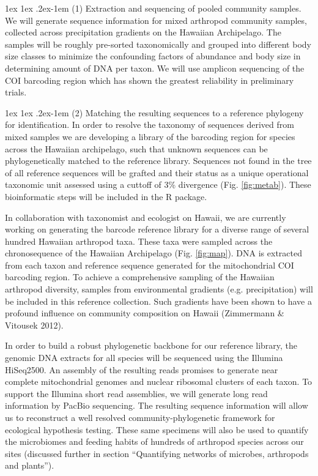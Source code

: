 \documentclass[11pt]{article}
\makeatletter
\renewcommand{\paragraph}{\@startsection{paragraph}{4}{\z@}
  {1ex \@plus 1ex \@minus .2ex}{-1em}
  {\normalfont\normalsize\it}
}
\makeatother
\begin{document}
\paragraph{(1) Extraction and sequencing of pooled community samples.}
We will generate sequence information for mixed arthropod community
samples, collected across precipitation gradients on the Hawaiian
Archipelago. The samples will be roughly pre-sorted taxonomically and
grouped into different body size classes to minimize the confounding
factors of abundance and body size in determining amount of DNA per
taxon. We will use amplicon sequencing of the COI barcoding region
\citep{} which has shown the greatest reliability in preliminary
trials.


\paragraph{(2) Matching the resulting sequences to a reference
  phylogeny for identification.}
In order to resolve the taxonomy of sequences derived from mixed
samples we are developing a library of the barcoding region for
species across the Hawaiian archipelago, such that unknown sequences
can be phylogenetically matched \citep{} to the reference library.
Sequences not found in the tree of all reference sequences will be
grafted and their status as a unique operational taxonomic unit
assessed using a cuttoff of 3\% divergence (Fig. \ref{fig:metab}).
These bioinformatic steps will be included in the R package.

In collaboration with taxonomist and ecologist on Hawaii, we are
currently working on generating the barcode reference library for a
diverse range of several hundred Hawaiian arthropod taxa. These taxa
were sampled across the chronosequence of the Hawaiian Archipelago
(Fig. \ref{fig:map}). DNA is extracted from each taxon and reference
sequence generated for the mitochondrial COI barcoding region. To
achieve a comprehensive sampling of the Hawaiian arthropod diversity,
samples from environmental gradients (e.g. precipitation) will be
included in this reference collection. Such gradients have been shown
to have a profound influence on community composition on Hawaii
(Zimmermann \& Vitousek 2012).

In order to build a robust phylogenetic backbone for our reference
library, the genomic DNA extracts for all species will be sequenced
using the Illumina HiSeq2500. An assembly of the resulting reads
promises to generate near complete mitochondrial genomes and nuclear
ribosomal clusters of each taxon. To support the Illumina short read
assemblies, we will generate long read information by PacBio
sequencing. The resulting sequence information will allow us to
reconstruct a well resolved community-phylogenetic framework for
ecological hypothesis testing.  These same specimens will also be used
to quantify the microbiomes and feeding habits of hundreds of
arthropod species across our sites (discussed further in section
``Quantifying networks of microbes, arthropods and plants'').
\end{document}
